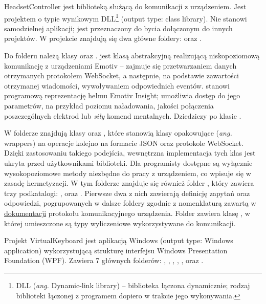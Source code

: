 \documentclass[skorowidz,skroty]{dyplomWEZUT}
\begin{document}
HeadsetController jest biblioteką służącą do komunikacji z urządzeniem. Jest projektem o typie wynikowym DLL\footnote{DLL (\textit{ang.} Dynamic-link library) -- biblioteka łączona dynamicznie; rodzaj biblioteki łączonej z programem dopiero w trakcie jego wykonywania.} (output type: class library). Nie stanowi samodzielnej aplikacji; jest przeznaczony do bycia dołączonym do innych projektów. W projekcie znajdują się dwa główne foldery:  oraz . 

Do folderu  należą klasy  oraz .  jest klasą abstrakcyjną realizującą niskopoziomową komunikację z urządzeniami Emotiv -- zajmuje się przetwarzaniem danych otrzymanych protokołem WebSocket, a następnie, na podstawie zawartości otrzymanej wiadomości, wywoływaniem odpowiednich eventów.  stanowi programową reprezentację hełmu Emotiv Insight; umożliwia dostęp do jego parametrów, na przykład poziomu naładowania, jakości połączenia poszczególnych elektrod lub \textit{siły} komend mentalnych. Dziedziczy po klasie .

W folderze  znajdują klasy  oraz , które stanowią klasy opakowujące (\textit{ang.} wrappers) na operacje kolejno na formacie JSON oraz protokole WebSocket. Dzięki zastosowaniu takiego podejścia, wewnętrzna implementacja tych klas jest ukryta przed użytkownikami biblioteki. Dla programisty dostępne są wyłącznie wysokopoziomowe metody niezbędne do pracy z urządzeniem, co wpisuje się w zasadę hermetyzacji. W tym folderze znajduje się również folder , który zawiera trzy podkatalogi: ,  oraz . Pierwsze dwa z nich zawierają definicję zapytań oraz odpowiedzi, pogrupowanych w dalsze foldery zgodnie z nomenklaturą zawartą w \href{https://emotiv.gitbook.io/cortex-api/}{dokumentacji} protokołu komunikacyjnego urządzenia. Folder  zawiera klasę , w której umieszczone są typy wyliczeniowe wykorzystywane do komunikacji.

Projekt VirtualKeyboard jest aplikacją Windows (output type: Windows application) wykorzystującą strukturę interfejsu Windows Presentation Foundation (WPF). Zawiera 7 głównych folderów: , , , , ,  oraz .
\end{document}
